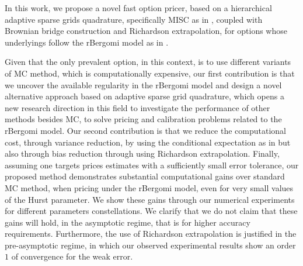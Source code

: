 In this work,  we propose a novel fast option pricer,  based on a  hierarchical adaptive sparse grids quadrature, specifically  MISC as in  \cite{haji2016multi}, coupled with Brownian bridge construction and Richardson extrapolation, for options whose underlyings  follow the rBergomi model as in \cite{bayer2016pricing}. 



Given that the only prevalent option, in this context, is to use different variants of MC method, which is computationally expensive, our first contribution  is that we uncover the available regularity in the rBergomi model and  design a novel alternative approach based on  adaptive sparse grid quadrature, which opens a new research direction in this field to investigate the performance of other methods besides MC, to solve pricing and calibration problems related to the rBergomi model. Our second contribution is that we reduce the computational cost, through variance reduction,  by using the conditional expectation as in \cite{mccrickerd2017turbocharging} but also through bias reduction through using Richardson extrapolation. Finally, assuming one targets prices estimates with a sufficiently small error tolerance, our proposed method demonstrates substantial computational gains  over standard MC method, when pricing under the rBergomi model, even for very small values of the Hurst parameter. We show  these gains through our numerical experiments for  different parameters constellations. We clarify that we do not claim that these gains will hold, in the asymptotic regime, that is for higher accuracy requirements. Furthermore, the use of Richardson extrapolation is justified in the pre-asymptotic regime, in which our observed experimental results  show an order $1$ of convergence for the weak error.


